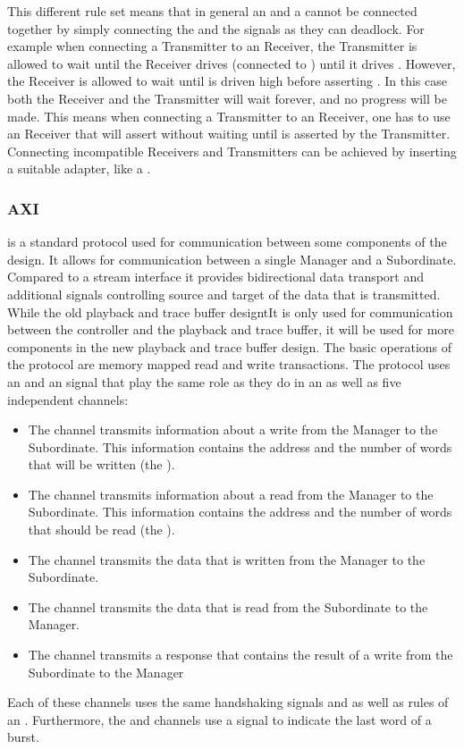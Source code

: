This different rule set means that in general an \AXIStream{} and a \ValidNextStream{} cannot be connected together by simply connecting the \TREADY{} and the \NEXT{} signals as they can deadlock. For example when connecting a \ValidNextStream{} Transmitter to an \AXIStream{} Receiver, the \ValidNextStream{} Transmitter is allowed to wait until the \AXIStream{} Receiver drives \TREADY{} (connected to \NEXT{}) until it drives \TVALID{}. However, the \AXIStream{} Receiver is allowed to wait until \TVALID{} is driven high before asserting \TREADY{}. In this case both the Receiver and the Transmitter will wait forever, and no progress will be made. This means when connecting a \ValidNextStream{} Transmitter to an \AXIStream{} Receiver, one has to use an \AXIStream{} Receiver that will assert \TREADY{} without waiting until \TVALID{} is asserted by the Transmitter. Connecting incompatible Receivers and Transmitters can be achieved by inserting a suitable adapter, like a \SKIDBuffer{}.

\subsubsection{AXI}\label{sec:AXI}
\AXI{}\autocite{ref:axi} is a standard protocol used for communication between some components of the \FPGA{} design. It allows for communication between a single Manager and a Subordinate. Compared to a stream interface it provides bidirectional data transport and additional signals controlling source and target of the data that is transmitted. While the old playback and trace buffer designtIt is only used for communication between the \DDR{} controller and the playback and trace buffer, it will be used for more components in the new playback and trace buffer design.
The basic operations of the \AXI{} protocol are memory mapped read and write transactions.
The \AXI{} protocol uses an \ACLK{} and an \ARESETn{} signal that play the same role as they do in an \AXIStream{} as well as five independent channels:
\begin{itemize}
  \item The \AW{} channel transmits information about a write from the Manager to the Subordinate. This information contains the address and the number of words that will be written (the \burstsize{}).
  \item The \AR{} channel transmits information about a read from the Manager to the Subordinate. This information contains the address and the number of words that should be read (the \burstsize{}).
  \item The \W{} channel transmits the data that is written from the Manager to the Subordinate.
  \item The \R{} channel transmits the data that is read from the Subordinate to the Manager.
  \item The \B{} channel transmits a response that contains the result of a write from the Subordinate to the Manager
\end{itemize}
Each of these channels uses the same handshaking signals \READY{} and \VALID{} as well as rules of an \AXIStream{}. Furthermore, the \W{} and \R{} channels use a \LAST{} signal to indicate the last word of a burst.

